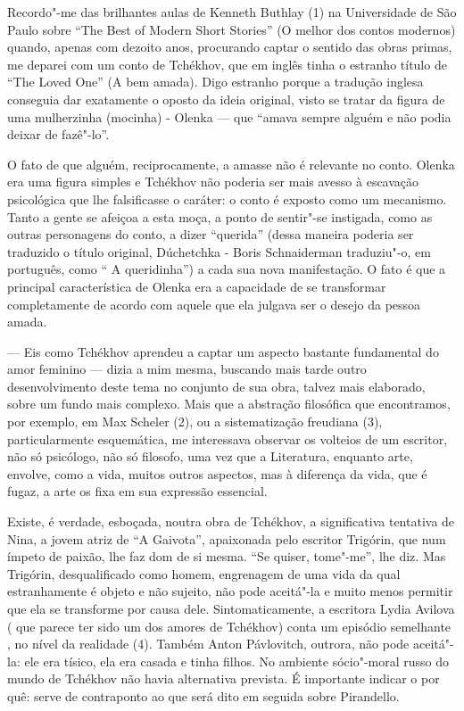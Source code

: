 Recordo"-me das brilhantes aulas de Kenneth Buthlay (1) na Universidade
de São Paulo sobre ``The Best of Modern Short Stories'' (O melhor dos
contos modernos) quando, apenas com dezoito anos, procurando captar o
sentido das obras primas, me deparei com um conto de Tchékhov, que em
inglês tinha o estranho título de ``The Loved One'' (A bem amada). Digo
estranho porque a tradução inglesa conseguia dar exatamente o oposto da
ideia original, visto se tratar da figura de uma mulherzinha (mocinha) -
Olenka --- que ``amava sempre alguém e não podia deixar de fazê"-lo''.

O fato de que alguém, reciprocamente, a amasse não é relevante no conto.
Olenka era uma figura simples e Tchékhov não poderia ser mais avesso à
escavação psicológica que lhe falsificasse o caráter: o conto é exposto
como um mecanismo. Tanto a gente se afeiçoa a esta moça, a ponto de
sentir"-se instigada, como as outras personagens do conto, a dizer
``querida'' (dessa maneira poderia ser traduzido o título original,
Dúchetchka - Boris Schnaiderman traduziu"-o, em português, como `` A
queridinha'') a cada sua nova manifestação. O fato é que a principal
característica de Olenka era a capacidade de se transformar
completamente de acordo com aquele que ela julgava ser o desejo da
pessoa amada.

--- Eis como Tchékhov aprendeu a captar um aspecto bastante fundamental do
amor feminino --- dizia a mim mesma, buscando mais tarde outro
desenvolvimento deste tema no conjunto de sua obra, talvez mais
elaborado, sobre um fundo mais complexo. Mais que a abstração filosófica
que encontramos, por exemplo, em Max Scheler (2), ou a sistematização
freudiana (3), particularmente esquemática, me interessava observar os
volteios de um escritor, não só psicólogo, não só filosofo, uma vez que
a Literatura, enquanto arte, envolve, como a vida, muitos outros
aspectos, mas à diferença da vida, que é fugaz, a arte os fixa em sua
expressão essencial.

Existe, é verdade, esboçada, noutra obra de Tchékhov, a significativa
tentativa de Nina, a jovem atriz de ``A Gaivota'', apaixonada pelo
escritor Trigórin, que num ímpeto de paixão, lhe faz dom de si mesma.
``Se quiser, tome"-me'', lhe diz. Mas Trigórin, desqualificado como
homem, engrenagem de uma vida da qual estranhamente é objeto e não
sujeito, não pode aceitá"-la e muito menos permitir que ela se transforme
por causa dele. Sintomaticamente, a escritora Lydia Avilova ( que parece
ter sido um dos amores de Tchékhov) conta um episódio semelhante , no
nível da realidade (4). Também Anton Pávlovitch, outrora, não pode
aceitá"-la: ele era tísico, ela era casada e tinha filhos. No ambiente
sócio"-moral russo do mundo de Tchékhov não havia alternativa prevista. É
importante indicar o por quê: serve de contraponto ao que será dito em
seguida sobre Pirandello.

